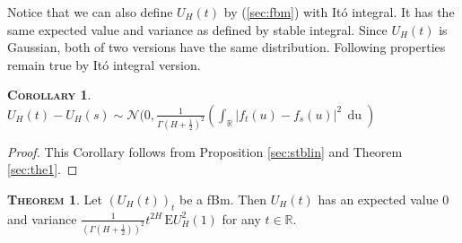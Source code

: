 \documentclass[a4paper, twoside, 11pt]{article}
\theoremstyle{definition}
\newtheorem{theorem}[definition]{\scshape Theorem}
\newtheorem{corollary}[definition]{\scshape Corollary}
\begin{document}
  Notice that we can also define $U_H(t)$ by (\ref{sec:fbm}) with It\'o integral. It has the same expected value and variance as defined by stable integral. Since $U_H(t)$ is Gaussian, both of two versions have the same distribution. Following properties remain true by It\'o integral version.
  \begin{corollary}
	$U_H(t)-U_H(s) \sim \mathcal{N}(0, \frac{1}{\Gamma(H+\frac{1}{2})^2}(\int_{\mathbb{R}} |f_t(u)-f_s(u)|^2\, \mathop{du})$
	\label{sec:the2}
  \end{corollary}
  \begin{proof}
	This Corollary follows from Proposition \ref{sec:stblin} and Theorem \ref{sec:the1}.
  \end{proof}
  \begin{theorem}
	Let $(U_H(t))_t$ be a fBm. Then $U_H(t)$ has an expected value $0$ and variance $\frac{1}{(\Gamma(H+\frac{1}{2}))^2}t^{2H}\, \mathrm{E} U^2_H(1)$ for any $t \in \mathbb{R}$.
	\label{sec:fbmp1}
  \end{theorem}
\end{document}
